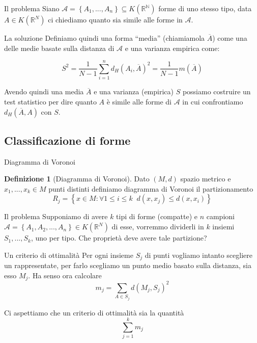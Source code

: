 \documentclass{beamer}
\newcounter{counter1}
\theoremstyle{plain}
\theoremstyle{definition}
\newtheorem{mydef}[counter1]{Definizione}
\theoremstyle{remark}
\newcommand{\obar}[1]{\overline{#1}}
\newcommand{\set}[1]{\left\{#1\right\}}
\begin{document}
\begin{frame}{Il problema}
  Siano $\mathcal{A} = \set{ A_1,...,A_n} \subseteq K(\mathbb{R^N})$
  forme di uno stesso tipo, data $A \in K(\mathbb{R}^N)$ ci chiediamo
  quanto sia simile alle forme in $\mathcal{A}$.
\end{frame}

\begin{frame}{La soluzione}
  Definiamo quindi una forma ``media'' (chiamiamola $\obar A$) come
  una delle medie basate sulla distanza di $\mathcal{A}$ e una
  varianza empirica come:

  \[ S^2 = \frac{1}{N-1} \sum _{i=1} ^n d_H(A_i , \obar A)^2 =
  \frac{1}{N-1} m(\obar A) \]

  Avendo quindi una media $\obar A$ e una varianza (empirica) $S$
  possiamo costruire un test statistico per dire quanto $A$ è simile
  alle forme di $\mathcal{A}$ in cui confrontiamo $d_H(\obar A, A)$
  con $S$.
\end{frame}


\subsection{Classificazione di forme}

\begin{frame}{Diagramma di Voronoi}
  \begin{mydef}[Diagramma di Voronoi]
    Dato $(M,d)$ spazio metrico e $x_1,...,x_k \in M$ punti distinti
    definiamo diagramma di Voronoi il partizionamento
    \[ R_j = \set{ x\in M : \forall 1 \le i \le k \;\; d(x,x_j) \le
      d(x,x_i) } \]
  \end{mydef}
\end{frame}

\begin{frame}{Il problema}
  Supponiamo di avere $k$ tipi di forme (compatte) e $n$ campioni
  $\mathcal{A} = \set{ A_1, A_2,..., A_n} \in K(\mathbb{R}^N)$ di esse,
  vorremmo dividerli in $k$ insiemi $S_1,...,S_k$, uno per tipo. Che
  proprietà deve avere tale partizione?
\end{frame}

\begin{frame}{Un criterio di ottimalità}
  Per ogni insieme $S_j$ di punti vogliamo intanto scegliere un
  rappresentate, per farlo scegliamo un punto medio basato sulla
  distanza, sia esso $M_j$. Ha senso ora calcolare
  \[ m_j = \sum _{A\in S_j} d(M_j,S_j)^2 \]
  
  \vfill

  Ci aspettiamo che un criterio di ottimalità sia la quantità
  \[ \sum _{j=1} ^k m_j \]
\end{frame}
\end{document}
